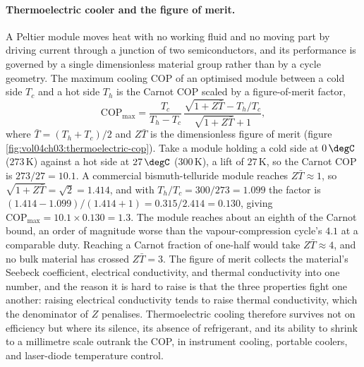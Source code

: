 \paragraph{Thermoelectric cooler and the figure of merit.} A Peltier module moves
heat with no working fluid and no moving part by driving current through a
junction of two semiconductors, and its performance is governed by a single
dimensionless material group rather than by a cycle geometry. The maximum cooling
COP of an optimised module between a cold side $T_c$ and a hot side $T_h$ is the
Carnot COP scaled by a figure-of-merit factor,
\[
\text{COP}_{\max} = \frac{T_c}{T_h - T_c}\,
\frac{\sqrt{1 + Z\bar T} - T_h/T_c}{\sqrt{1 + Z\bar T} + 1},
\]
where $\bar T = (T_h + T_c)/2$ and $Z\bar T$ is the dimensionless figure of merit
(figure \ref{fig:vol04ch03:thermoelectric-cop}). Take a module holding a cold
side at $0\,\degC$ ($273\,\si{\kelvin}$) against a hot side at $27\,\degC$
($300\,\si{\kelvin}$), a lift of $27\,\si{\kelvin}$, so the Carnot COP is
$273/27 = 10.1$. A commercial bismuth-telluride module reaches $Z\bar T \approx
1$, so $\sqrt{1 + Z\bar T} = \sqrt 2 = 1.414$, and with $T_h/T_c = 300/273 =
1.099$ the factor is $(1.414 - 1.099)/(1.414 + 1) = 0.315/2.414 = 0.130$, giving
$\text{COP}_{\max} = 10.1 \times 0.130 = 1.3$. The module reaches about an eighth
of the Carnot bound, an order of magnitude worse than the vapour-compression
cycle's $4.1$ at a comparable duty. Reaching a Carnot fraction of one-half would
take $Z\bar T \approx 4$, and no bulk material has crossed $Z\bar T = 3$. The
figure of merit collects the material's Seebeck coefficient, electrical
conductivity, and thermal conductivity into one number, and the reason it is hard
to raise is that the three properties fight one another: raising electrical
conductivity tends to raise thermal conductivity, which the denominator of $Z$
penalises. Thermoelectric cooling therefore survives not on efficiency but where
its silence, its absence of refrigerant, and its ability to shrink to a
millimetre scale outrank the COP, in instrument cooling, portable coolers, and
laser-diode temperature control.



